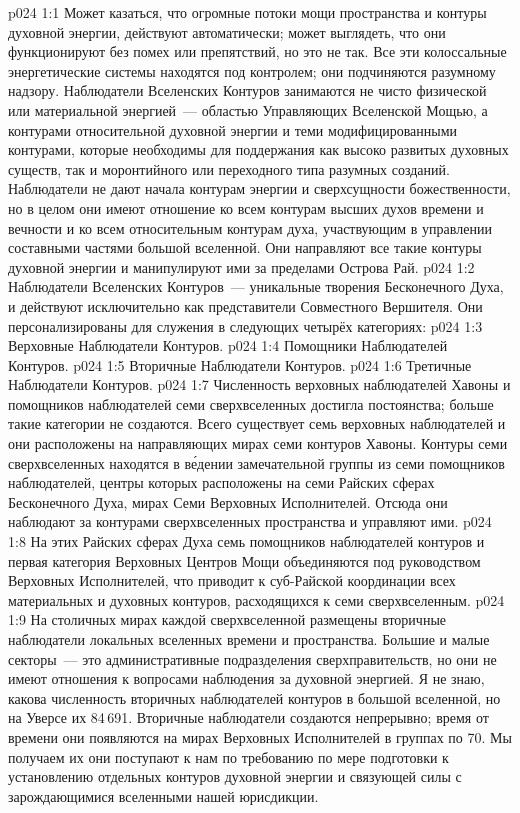 \vs p024 1:1 Может казаться, что огромные потоки мощи пространства и контуры духовной энергии, действуют автоматически; может выглядеть, что они функционируют без помех или препятствий, но это не так. Все эти колоссальные энергетические системы находятся под контролем; они подчиняются разумному надзору. Наблюдатели Вселенских Контуров занимаются не чисто физической или материальной энергией~--- областью Управляющих Вселенской Мощью, а контурами относительной духовной энергии и теми модифицированными контурами, которые необходимы для поддержания как высоко развитых духовных существ, так и моронтийного или переходного типа разумных созданий. Наблюдатели не дают начала контурам энергии и сверхсущности божественности, но в целом они имеют отношение ко всем контурам высших духов времени и вечности и ко всем относительным контурам духа, участвующим в управлении составными частями большой вселенной. Они направляют все такие контуры духовной энергии и манипулируют ими за пределами Острова Рай.
\vs p024 1:2 \pc Наблюдатели Вселенских Контуров~--- уникальные творения Бесконечного Духа, и действуют исключительно как представители Совместного Вершителя. Они персонализированы для служения в следующих четырёх категориях:
\vs p024 1:3 Верховные Наблюдатели Контуров.
\vs p024 1:4 Помощники Наблюдателей Контуров.
\vs p024 1:5 Вторичные Наблюдатели Контуров.
\vs p024 1:6 Третичные Наблюдатели Контуров.
\vs p024 1:7 \pc Численность верховных наблюдателей Хавоны и помощников наблюдателей семи сверхвселенных достигла постоянства; больше такие категории не создаются. Всего существует семь верховных наблюдателей и они расположены на направляющих мирах семи контуров Хавоны. Контуры семи сверхвселенных находятся в в\'едении замечательной группы из семи помощников наблюдателей, центры которых расположены на семи Райских сферах Бесконечного Духа, мирах Семи Верховных Исполнителей. Отсюда они наблюдают за контурами сверхвселенных пространства и управляют ими.
\vs p024 1:8 На этих Райских сферах Духа семь помощников наблюдателей контуров и первая категория Верховных Центров Мощи объединяются под руководством Верховных Исполнителей, что приводит к суб\hyp{}Райской координации всех материальных и духовных контуров, расходящихся к семи сверхвселенным.
\vs p024 1:9 На столичных мирах каждой сверхвселенной размещены вторичные наблюдатели локальных вселенных времени и пространства. Большие и малые секторы~--- это административные подразделения сверхправительств, но они не имеют отношения к вопросами наблюдения за духовной энергией. Я не знаю, какова численность вторичных наблюдателей контуров в большой вселенной, но на Уверсе их 84\,691. Вторичные наблюдатели создаются непрерывно; время от времени они появляются на мирах Верховных Исполнителей в группах по 70. Мы получаем их {они поступают к нам} по требованию по мере подготовки к установлению отдельных контуров духовной энергии и связующей силы с зарождающимися вселенными нашей юрисдикции.
